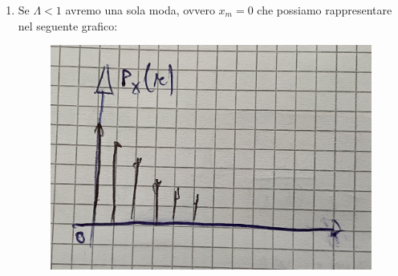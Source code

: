 \documentclass{article}
\begin{document}
\begin{enumerate}
\begin{figure}[ht]
    \end{figure} 
    \item Se $\Lambda < 1$ avremo una sola moda, ovvero $x_m = 0$ che possiamo rappresentare nel seguente grafico:
    \begin{figure}[ht]
    \centering
    \includegraphics[scale=0.10]{images/68.PoissDeltaMin.jpeg}
    \end{figure} 
\end{enumerate} 
\end{document}
